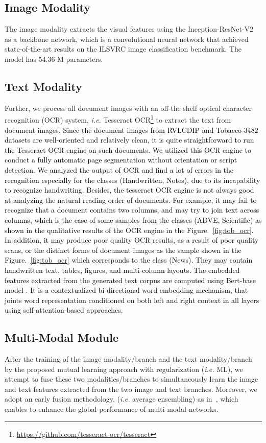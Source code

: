 \documentclass[twocolumn]{svjour3}
\newcommand{\ie}{\textit{i.e. }}
\begin{document}
\subsection{Image Modality}
The image modality extracts the visual features using the Inception-ResNet-V2 \cite{Szegedy2017Inceptionv4IA} as a backbone network, which is a convolutional neural network that achieved state-of-the-art results on the ILSVRC image classification benchmark. The model has 54.36 M parameters. 

\subsection{Text Modality}
Further, we process all document images with an off-the shelf optical character recognition (OCR) system, \ie Tesseract OCR\footnote{\url{https://github.com/tesseract-ocr/tesseract}} to extract the text from document images. \textcolor{black}{Since the document images from RVLCDIP and Tobacco-3482 datasets are well-oriented and relatively clean, it is quite straightforward to run the Tesseract OCR engine on such documents. We utilized this OCR engine to conduct a fully automatic page segmentation without orientation or script detection. We analyzed the output of OCR and find a lot of errors in the recognition especially for the classes (Handwritten, Notes), due to its incapability to recognize handwriting. Besides, the tesseract OCR engine is not always good at analyzing the natural reading order of documents. \textcolor{black}{For example, it may fail to recognize that a document contains two columns, and may try to join text across columns, which is the case of some samples from the classes (ADVE, Scientific) as shown in the qualitative results of the OCR engine in the Figure.~\ref{fig:tob_ocr}. In addition, it may produce poor quality OCR results, as a result of poor quality scans, or the distinct forms of document images as the sample shown in the Figure.~\ref{fig:tob_ocr} which corresponds to the class (News). They may contain handwritten text, tables, figures, and multi-column layouts}. The embedded features extracted from the generated text corpus are computed using Bert-base model \cite{Devlin2019BERTPO}. It is a contextualized bi-directional word embedding mechanism, that joints word representation conditioned on both left and right context in all layers using self-attention-based approaches.}

\subsection{Multi-Modal Module}
After the training of the image modality/branch and the text modality/branch by the proposed mutual learning approach with regularization (\textit{i.e.} ML), we attempt to fuse these two modalities/branches to simultaneously learn the image and text features extracted from the two image and text branches. Moreover, we adopt an early fusion methodology, (\textit{i.e.} average ensembling) as in~\cite{souhailbakkali}, which enables to enhance the global performance of multi-modal networks.
\end{document}
